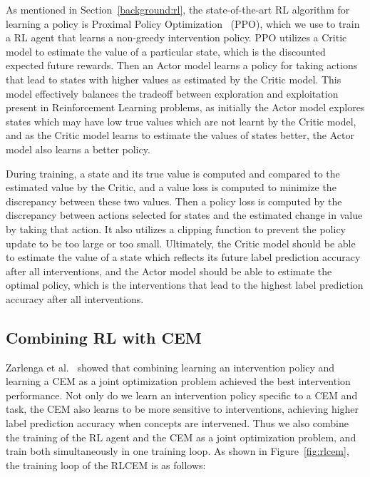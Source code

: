 As mentioned in Section~\ref{background:rl}, the state-of-the-art RL algorithm 
for learning
a policy is Proximal Policy Optimization~\cite{ppo} (PPO), which we use
to train a RL agent that learns a non-greedy intervention policy.
PPO utilizes a Critic model to estimate
the value of a particular state, which is the discounted expected future rewards. Then
an Actor model learns a policy
for taking actions that lead to states with higher values as estimated by the
Critic model.
This model effectively balances the tradeoff between exploration and exploitation
present in Reinforcement Learning problems,
as initially the Actor model explores states which may have low true values
which are not learnt by the Critic model, and as the Critic model
learns to estimate the values of states better, the Actor model also 
learns a better policy.

During training, a state and its true value is computed
and compared to the estimated value by the Critic, and a value loss is computed to minimize
the discrepancy between these two values. Then a policy loss is computed
by the discrepancy between actions selected for states and the estimated
change in value by taking that action. It also utilizes
a clipping function to prevent the policy update 
to be too large or too small.
Ultimately, the Critic model
should be able to estimate the value of a state which reflects
its future label prediction accuracy after all interventions,
and the Actor model should be able to estimate the optimal policy, 
which is the interventions that lead to the highest label prediction accuracy 
after all interventions.

\subsection{Combining RL with CEM}

Zarlenga et al.~\cite{intcem} showed that combining learning an intervention policy
and learning a CEM as a joint optimization problem achieved the best intervention performance.
Not only do we learn an intervention policy specific to a CEM and task, the 
CEM also learns to be more sensitive to interventions, achieving higher label prediction accuracy
when concepts are intervened. Thus we also combine the training of the RL agent and the CEM
as a joint optimization problem, and train
both simultaneously in one training loop.
As shown in Figure~\ref{fig:rlcem}, the training loop
of the RLCEM is as follows:

